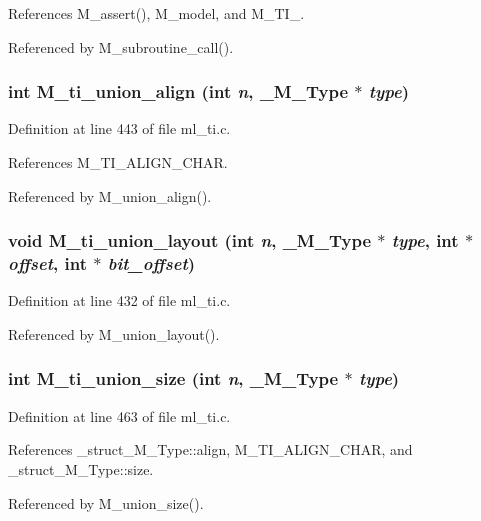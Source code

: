 References M\_\-assert(), M\_\-model, and M\_\-TI\_.

Referenced by M\_\-subroutine\_\-call().
\subsubsection{\setlength{\rightskip}{0pt plus 5cm}int M\_\-ti\_\-union\_\-align (int {\em n}, \bf{\_\-M\_\-Type} $\ast$ {\em type})}\label{ml__ti_8c_ead1bc1d961b416baea9cd538b2076f3}




Definition at line 443 of file ml\_\-ti.c.

References M\_\-TI\_\-ALIGN\_\-CHAR.

Referenced by M\_\-union\_\-align().
\subsubsection{\setlength{\rightskip}{0pt plus 5cm}void M\_\-ti\_\-union\_\-layout (int {\em n}, \bf{\_\-M\_\-Type} $\ast$ {\em type}, int $\ast$ {\em offset}, int $\ast$ {\em bit\_\-offset})}\label{ml__ti_8c_5fb0cb519449366a2cfe9b8d6d44d911}




Definition at line 432 of file ml\_\-ti.c.

Referenced by M\_\-union\_\-layout().
\subsubsection{\setlength{\rightskip}{0pt plus 5cm}int M\_\-ti\_\-union\_\-size (int {\em n}, \bf{\_\-M\_\-Type} $\ast$ {\em type})}\label{ml__ti_8c_a0ea480b946299870b13777af2aa0777}




Definition at line 463 of file ml\_\-ti.c.

References \_\-struct\_\-M\_\-Type::align, M\_\-TI\_\-ALIGN\_\-CHAR, and \_\-struct\_\-M\_\-Type::size.

Referenced by M\_\-union\_\-size().
